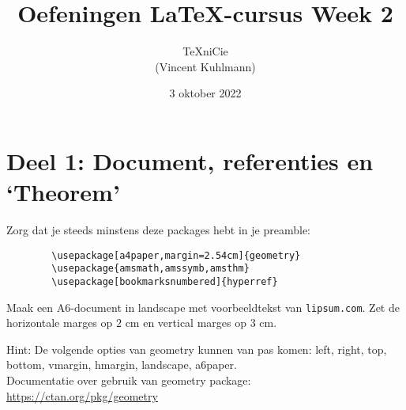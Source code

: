 \documentclass[a4paper]{article}
\title{\vspace{-65pt} Oefeningen \LaTeX-cursus Week 2}
\author{\TeX niCie\\{\small (Vincent Kuhlmann)}}
\date{3 oktober 2022}
\begin{document}
\maketitle


\section{Deel 1: Document, referenties en `Theorem'}
Zorg dat je steeds minstens deze packages hebt in je preamble:
\begin{verbatim}
        \usepackage[a4paper,margin=2.54cm]{geometry}
        \usepackage{amsmath,amssymb,amsthm}
        \usepackage[bookmarksnumbered]{hyperref}
    \end{verbatim}
\bigskip

\begin{exercise}[Geometry]\label{ex:aaaa}
    Maak een A6-document in landscape met voorbeeldtekst van \nolinkurl{lipsum.com}. Zet de
    horizontale marges op $ 2\text{ cm} $ en vertical marges op $ 3\text{ cm} $.

    Hint: De volgende opties van geometry kunnen van pas komen: left, right, top, bottom,
    vmargin, hmargin, landscape, a6paper.\\
    Documentatie over gebruik van geometry package: \url{https://ctan.org/pkg/geometry}
\end{exercise}


\end{document}
